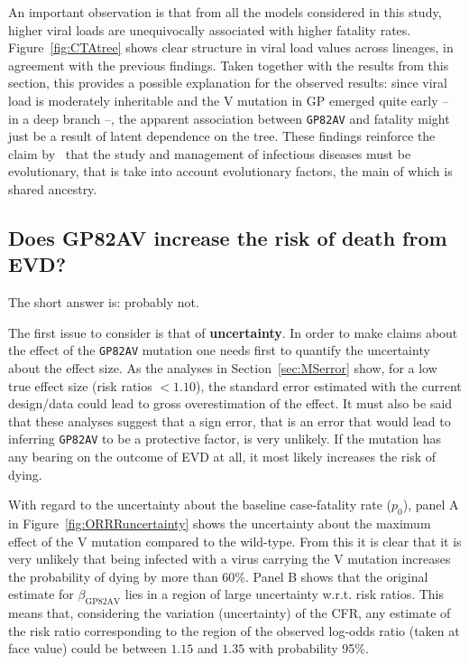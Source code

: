 An important observation is that from all the models considered in this study, higher viral loads are unequivocally associated with higher fatality rates.
Figure~\ref{fig:CTAtree} shows clear structure in viral load values across lineages, in agreement with the previous findings.
Taken together with the results from this section, this provides a possible explanation for the observed results: since viral load is moderately inheritable and the V mutation in GP emerged quite early -- in a deep branch --, the apparent association between \verb|GP82AV| and fatality might just be a result of latent dependence on the tree.
These findings reinforce the claim by~\cite{Russell2017} that the study and management of infectious diseases must be evolutionary, that is take into account evolutionary factors, the main of which is shared ancestry.

\subsection{Does GP82AV increase the risk of death from EVD?}

The short answer is: probably not.

The first issue to consider is that of \textbf{uncertainty}. 
In order to make claims about the effect of the \verb|GP82AV| mutation one needs first to quantify the uncertainty about the effect size.
As the analyses in Section~\ref{sec:MSerror} show, for a low true effect size (risk ratios $<1.10$), the standard error estimated with the current design/data could lead to gross overestimation of the effect. 
It must also be said that these analyses suggest that a sign error, that is an error that would lead to inferring \verb|GP82AV| to be a protective factor, is very unlikely.
If the mutation has any bearing on the outcome of EVD at all, it most likely increases the risk of dying.

With regard to the uncertainty about the baseline case-fatality rate ($p_0$), panel A in Figure~\ref{fig:ORRRuncertainty} shows the uncertainty about the maximum effect of the V mutation compared to the wild-type.
From this it is clear that it is very unlikely that being infected with a virus carrying the V mutation increases the probability of dying by more than $60$\%.
Panel B shows that the original estimate for $\beta_{\text{GP82AV}}$ lies in a region of large uncertainty w.r.t. risk ratios.
This means that, considering the variation (uncertainty) of the CFR, any estimate of the risk ratio corresponding  to the region of the observed log-odds ratio (taken at face value) could be between $1.15$ and $1.35$ with probability 95\%.

